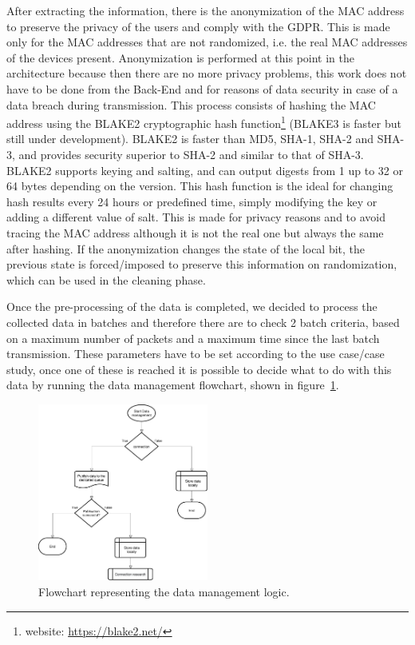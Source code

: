After extracting the information, there is the anonymization of the MAC address to preserve the privacy of the users and comply with the GDPR. This is made only for the MAC addresses that are not randomized, i.e. the real MAC addresses of the devices present. Anonymization is performed at this point in the architecture because then there are no more privacy problems, this work does not have to be done from the Back-End and for reasons of data security in case of a data breach during transmission.
This process consists of hashing the MAC address using the BLAKE2 cryptographic hash function\footnote{ website: \url{https://blake2.net/} } (BLAKE3 is faster but still under development). BLAKE2 is faster than MD5, SHA-1, SHA-2 and SHA-3, and provides security superior to SHA-2 and similar to that of SHA-3. BLAKE2 supports keying and salting, and can output digests from 1 up to 32 or 64 bytes depending on the version. This hash function is the ideal for changing hash results every 24 hours or predefined time, simply modifying the key or adding a different value of salt. This is made for privacy reasons and to avoid tracing the MAC address although it is not the real one but always the same after hashing.
If the anonymization changes the state of the local bit, the previous state is forced/imposed to preserve this information on randomization, which can be used in the cleaning phase.

Once the pre-processing of the data is completed, we decided to process the collected data in batches and therefore there are to check 2 batch criteria, based on a maximum number of packets and a maximum time since the last batch transmission. These parameters have to be set according to the use case/case study, once one of these is reached it is possible to decide what to do with this data by running the data management flowchart, shown in figure~\ref{fig:flowdata}.

\begin{figure}[h]
\centering 
\includegraphics[width=0.5\textwidth]{images/flowdata} 
\caption{Flowchart representing the data management logic.}
\label{fig:flowdata}
\end{figure}

